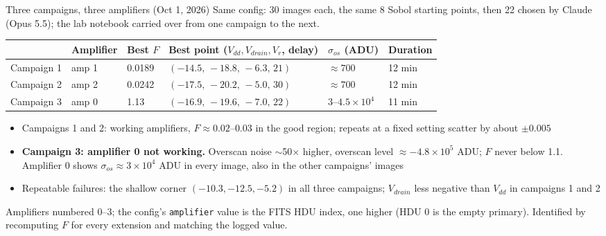 \documentclass[aspectratio=169,10pt]{beamer}
\newcommand{\ampA}{amp 1}   %
\newcommand{\ampB}{amp 2}   %
\newcommand{\ampC}{amp 0}   %
\begin{document}
\begin{frame}{Three campaigns, three amplifiers (Oct 1, 2026)}
  \small
  Same config: 30 images each, the same 8 Sobol starting points, then 22 chosen by Claude
  (Opus 5.5); the lab notebook carried over from one campaign to the next.

  \vspace{2mm}
  \begin{tabular}{llllll}
    \toprule
    & Amplifier & Best $F$ & Best point ($V_{dd}, V_{drain}, V_r$, delay) & $\sigma_{os}$ (ADU) & Duration \\
    \midrule
    Campaign 1 & \ampA & 0.0189 & $(-14.5,\,-18.8,\,-6.3,\,21)$ & $\approx 700$ & 12 min \\
    Campaign 2 & \ampB & 0.0242 & $(-17.5,\,-20.2,\,-5.0,\,30)$ & $\approx 700$ & 12 min \\
    Campaign 3 & \ampC & 1.13   & $(-16.9,\,-19.6,\,-7.0,\,22)$ & $3$--$4.5\times10^{4}$ & 11 min \\
    \bottomrule
  \end{tabular}

  \vspace{3mm}
  \begin{itemize}
    \item Campaigns 1 and 2: working amplifiers, $F \approx 0.02$--$0.03$ in the good region;
          repeats at a fixed setting scatter by about $\pm 0.005$
    \item \textbf{Campaign 3: amplifier 0 not working.} Overscan noise $\sim$50$\times$ higher,
          overscan level $\approx -4.8\times10^{5}$ ADU; $F$ never below 1.1. Amplifier 0 shows
          $\sigma_{os} \approx 3\times10^{4}$ ADU in every image, also in the other campaigns' images
    \item Repeatable failures: the shallow corner $(-10.3, -12.5, -5.2)$ in all three
          campaigns; $V_{drain}$ less negative than $V_{dd}$ in campaigns 1 and 2
  \end{itemize}

  \vspace{1mm}
  {\scriptsize Amplifiers numbered 0--3; the config's \texttt{amplifier} value is the FITS HDU
   index, one higher (HDU 0 is the empty primary). Identified by recomputing $F$ for every
   extension and matching the logged value.}
\end{frame}
\end{document}
